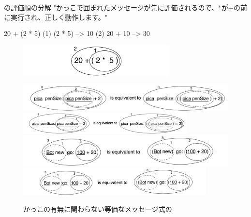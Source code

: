 \documentclass[a4paper,10pt,twoside]{book}
\begin{document}
\begin{example}[mathcorrect]{の評価順の分解}{}
"かっこで囲まれたメッセージが先に評価されるので、*が+の前に実行され、正しく動作します。"

    20 + (2 * 5) 
(1)        (2 * 5) --> 10
(2) 20 + 10      --> 30
\end{example}

\begin{figure}
\begin{center}
\includegraphics[width=8cm]{ucompoNumberBracket}
\end{center}
\end{figure}



\begin{figure}
\begin{center}
\ifluluelse
	{\includegraphics[width=\textwidth]{uKeyUnBinPar}}
	{\includegraphics[width=0.8\textwidth]{uKeyUnBinPar}}
\ifluluelse
	{\includegraphics[width=\textwidth]{uunKeyBinPar}}
	{\includegraphics[width=10cm]{uunKeyBinPar}}
\end{center}
\caption{かっこの有無に関わらない等価なメッセージ式の}
\end{figure}
\end{document}
